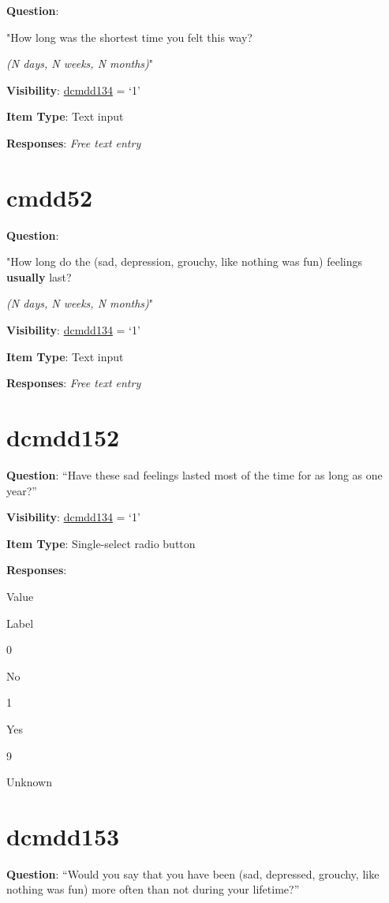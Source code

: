 \documentclass[]{book}
\begin{document}
\textbf{Question}:

"How long was the shortest time you felt this way?

\emph{(N days, N weeks, N months)}"

\textbf{Visibility}: \protect\hyperlink{dcmdd134}{dcmdd134} = `1'

\textbf{Item Type}: Text input

\textbf{Responses}: \emph{Free text entry}

\hypertarget{cmdd52}{%
\section{cmdd52}\label{cmdd52}}

\textbf{Question}:

"How long do the (sad, depression, grouchy, like nothing was fun) feelings \textbf{usually} last?

\emph{(N days, N weeks, N months)}"

\textbf{Visibility}: \protect\hyperlink{dcmdd134}{dcmdd134} = `1'

\textbf{Item Type}: Text input

\textbf{Responses}: \emph{Free text entry}

\hypertarget{dcmdd152}{%
\section{dcmdd152}\label{dcmdd152}}

\textbf{Question}: ``Have these sad feelings lasted most of the time for as long as one year?''

\textbf{Visibility}: \protect\hyperlink{dcmdd134}{dcmdd134} = `1'

\textbf{Item Type}: Single-select radio button

\textbf{Responses}:

Value

Label

0

No

1

Yes

9

Unknown

\hypertarget{dcmdd153}{%
\section{dcmdd153}\label{dcmdd153}}

\textbf{Question}: ``Would you say that you have been (sad, depressed, grouchy, like nothing was fun) more often than not during your lifetime?''
\end{document}
